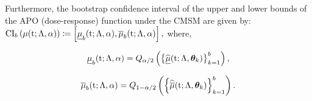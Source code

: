 Furthermore, the bootstrap confidence interval of the upper and lower bounds of the APO (dose-response) function under the CMSM are given by:
$
    \label{eq:apo_ci}
    \mathrm{CI}_b\left(\mu(\mathrm{t}; \Lambda, \alpha) \right) \coloneqq \left[ \underline{\mu}_{b}(\mathrm{t}; \Lambda, \alpha), \overline{\mu}_{b}(\mathrm{t}; \Lambda, \alpha) \right], 
$
where,
\noindent
\begin{minipage}{.5\linewidth}
    \begin{equation*}
        \underline{\mu}_{b}(\mathrm{t}; \Lambda, \alpha) = Q_{\alpha / 2} \left( \left\{ \widehat{\underline{\mu}}(\mathrm{t}; \Lambda, \bm{\theta}_k)  \right\}_{k = 1}^b \right),
    \end{equation*}
\end{minipage}%
\begin{minipage}{.5\linewidth}
    \begin{equation*}
        \overline{\mu}_{b}(\mathrm{t}; \Lambda, \alpha) =  Q_{1 - \alpha / 2} \left( \left\{ \widehat{\overline{\mu}}(\mathrm{t}; \Lambda, \bm{\theta}_k)  \right\}_{k = 1}^b \right).
    \end{equation*}
\end{minipage}